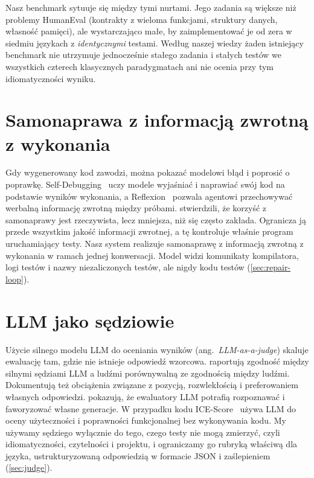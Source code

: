 Nasz benchmark sytuuje się między tymi nurtami. Jego zadania są większe niż problemy HumanEval
(kontrakty z wieloma funkcjami, struktury danych, własność pamięci), ale wystarczająco małe, by
zaimplementować je od zera w siedmiu językach z \emph{identycznymi} testami. Według naszej wiedzy
żaden istniejący benchmark nie utrzymuje jednocześnie stałego zadania i stałych testów we wszystkich
czterech klasycznych paradygmatach ani nie ocenia przy tym idiomatyczności wyniku.

\section{Samonaprawa z informacją zwrotną z wykonania}
\label{sec:related-repair}

Gdy wygenerowany kod zawodzi, można pokazać modelowi błąd i poprosić o poprawkę.
Self-Debugging~\cite{chen2024selfdebug} uczy modele wyjaśniać i naprawiać swój kod na podstawie
wyników wykonania, a Reflexion~\cite{shinn2023reflexion} pozwala agentowi przechowywać werbalną
informację zwrotną między próbami. \citet{olausson2024selfrepair} stwierdzili, że korzyść
z samonaprawy jest rzeczywista, lecz mniejsza, niż się często zakłada. Ogranicza ją przede wszystkim
jakość informacji zwrotnej, a tę kontroluje właśnie program uruchamiający testy. Nasz system
realizuje samonaprawę z informacją zwrotną z wykonania w ramach jednej konwersacji. Model widzi
komunikaty kompilatora, logi testów i nazwy niezaliczonych testów, ale nigdy kodu testów
(\cref{sec:repair-loop}).

\section{LLM jako sędziowie}
\label{sec:related-judge}

Użycie silnego modelu LLM do oceniania wyników (ang.~\emph{LLM-as-a-judge}) skaluje ewaluację tam,
gdzie nie istnieje odpowiedź wzorcowa. \citet{zheng2023judging} raportują zgodność między silnymi
sędziami LLM a ludźmi porównywalną ze zgodnością między ludźmi. Dokumentują też obciążenia związane
z pozycją, rozwlekłością i preferowaniem własnych odpowiedzi. \citet{panickssery2024selfpreference}
pokazują, że ewaluatory LLM potrafią rozpoznawać i faworyzować własne generacje. W przypadku kodu
ICE-Score~\cite{zhuo2024icescore} używa LLM do oceny użyteczności i poprawności funkcjonalnej bez
wykonywania kodu. My używamy sędziego wyłącznie do tego, czego testy nie mogą zmierzyć, czyli
idiomatyczności, czytelności i projektu, i ograniczamy go rubryką właściwą dla języka,
ustrukturyzowaną odpowiedzią w formacie JSON i zaślepieniem (\cref{sec:judge}).


